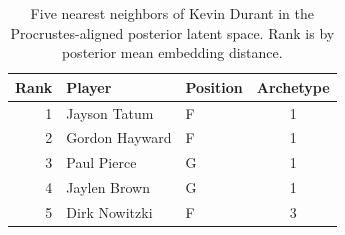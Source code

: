 \begin{table}[htbp]
  \centering\small
  \begin{tabular}{rllc}
    \toprule
    Rank & Player & Position & Archetype \\
    \midrule
    1 & Jayson Tatum & F & 1 \\
    2 & Gordon Hayward & F & 1 \\
    3 & Paul Pierce & G & 1 \\
    4 & Jaylen Brown & G & 1 \\
    5 & Dirk Nowitzki & F & 3 \\
    \bottomrule
  \end{tabular}
  \caption{Five nearest neighbors of Kevin Durant in the Procrustes-aligned posterior latent space. Rank is by posterior mean embedding distance.}
  \label{tab:Kevin_Durant_neighbors}
\end{table}

